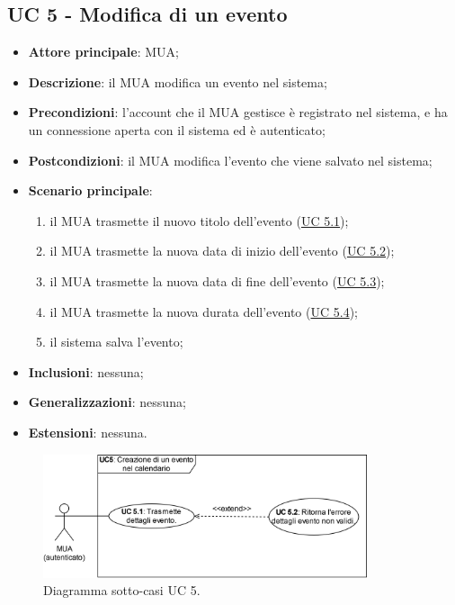 \subsection{UC 5 - Modifica di un evento} \label{sec:UC5}
    \begin{itemize}
        \item \textbf{Attore principale}: MUA;
        \item \textbf{Descrizione}: il MUA modifica un evento nel sistema;
        \item \textbf{Precondizioni}: l’account che il MUA gestisce è registrato nel sistema, e ha un connessione aperta con il sistema ed è autenticato;
        \item \textbf{Postcondizioni}: il MUA modifica l'evento che viene salvato nel sistema;
        \item \textbf{Scenario principale}:
            \begin{enumerate}
                \item il MUA trasmette il nuovo titolo dell'evento (\hyperref[sec:UC5.1]{UC 5.1});
                \item il MUA trasmette la nuova data di inizio dell'evento (\hyperref[sec:UC5.2]{UC 5.2});
                \item il MUA trasmette la nuova data di fine dell'evento (\hyperref[sec:UC5.3]{UC 5.3});
                \item il MUA trasmette la nuova durata dell'evento (\hyperref[sec:UC5.4]{UC 5.4});
                \item il sistema salva l'evento;
            \end{enumerate}
        \item \textbf{Inclusioni}: nessuna;
        \item \textbf{Generalizzazioni}: nessuna;
        \item \textbf{Estensioni}: nessuna.
    \end{itemize}

\begin{figure}[h]
    \includegraphics[width=0.85\textwidth]{sections/uc_imgs/UC05.X.png}
    \centering
    \caption{Diagramma sotto-casi UC 5.}
\end{figure}

